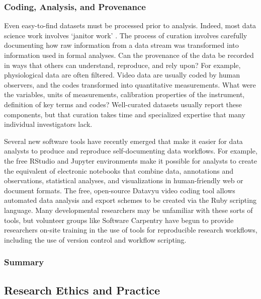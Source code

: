 \documentclass[letterpaper,man,apacite]{apa6}
\begin{document}
\subsubsection{Coding, Analysis, and Provenance}

Even easy-to-find datasets must be processed prior to analysis.
Indeed, most data science work involves `janitor work' \cite{lohr_for_2014}.
The process of curation involves carefully documenting how raw information from a data stream was transformed into information used in formal analyses. 
Can the provenance of the data be recorded in ways that others can understand, reproduce, and rely upon?
For example, physiological data are often filtered.
Video data are usually coded by human observers, and the codes transformed into quantitative measurements.
What were the variables, units of measurements, calibration properties of the instrument, definition of key terms and codes?
Well-curated datasets usually report these components, but that curation takes time and specialized expertise that many individual investigators lack.

Several new software tools have recently emerged that make it easier for data analysts to produce and reproduce self-documenting data workflows.
For example, the free RStudio \cite{RStudio} and Jupyter \cite{Jupyter} environments make it possible for analysts to create the equivalent of electronic notebooks that combine data, annotations and observations, statistical analyses, and visualizations in human-friendly web or document formats.
The free, open-source Datavyu \cite{Datavyu} video coding tool allows automated data analysis and export schemes to be created via the Ruby scripting language.
Many developmental researchers may be unfamiliar with these sorts of tools, but volunteer groups like Software Carpentry \cite{Software_Carpentry} have begun to provide researchers on-site training in the use of tools for reproducible research workflows, including the use of version control and workflow scripting.

\subsubsection{Summary}


\subsection{Research Ethics and Practice}
\end{document}

